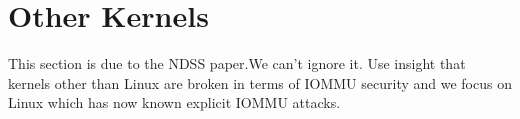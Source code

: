 \section{Other Kernels}
This section is due to the NDSS paper.We can't ignore it.
Use insight that kernels other than Linux are broken in terms of IOMMU security and we focus on Linux which has now known explicit IOMMU attacks.